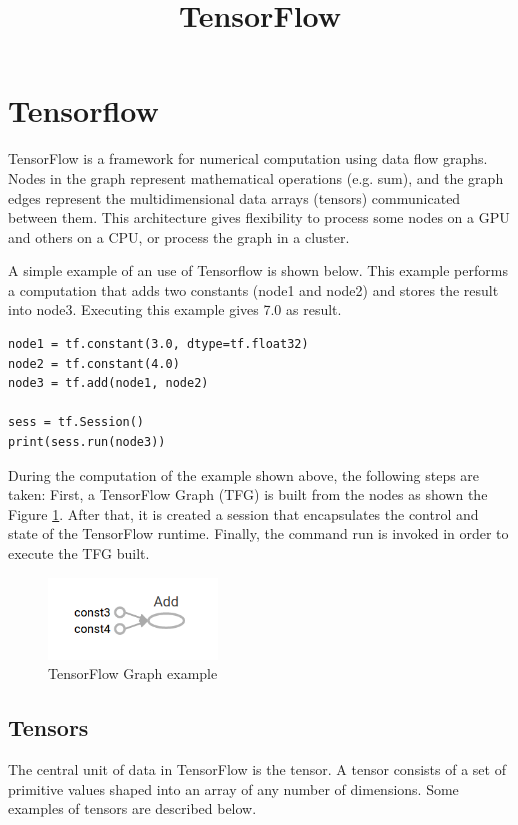 \documentclass[11pt, fleqn]{article}
\title{{\Huge \textbf{TensorFlow}}\vspace{-1cm}}
\date{}
\begin{document}

\section{Tensorflow}
TensorFlow is a framework for numerical computation using data flow graphs. Nodes in the graph represent mathematical operations (e.g. sum), and the graph edges represent the multidimensional data arrays (tensors) communicated between them. This architecture gives flexibility to process some nodes on a GPU and others on a CPU, or process the graph in a cluster.

A simple example of an use of Tensorflow is shown below. This example performs a computation that adds two constants (node1 and node2)  and stores the result into node3. Executing this example gives 7.0 as result.

\begin{verbatim}
node1 = tf.constant(3.0, dtype=tf.float32)
node2 = tf.constant(4.0)
node3 = tf.add(node1, node2)

sess = tf.Session()
print(sess.run(node3))
\end{verbatim}

During the computation of the example shown above, the following steps are taken: First, a TensorFlow Graph (TFG) is built from the nodes as shown the Figure \ref{fig:TFG_simple}. After that, it is created a session that encapsulates the control and state of the TensorFlow runtime. Finally, the command run is invoked in order to execute the TFG built. 

\begin{figure}[!htp]
    \centering
    \includegraphics[width=0.4\textwidth]{img/const_add.png}
    \caption{TensorFlow Graph example}
    \label{fig:TFG_simple}
\end{figure}

\subsection{Tensors}
The central unit of data in TensorFlow is the tensor. A tensor consists of a set of primitive values shaped into an array of any number of dimensions. Some examples of tensors are described below.
\end{document}
